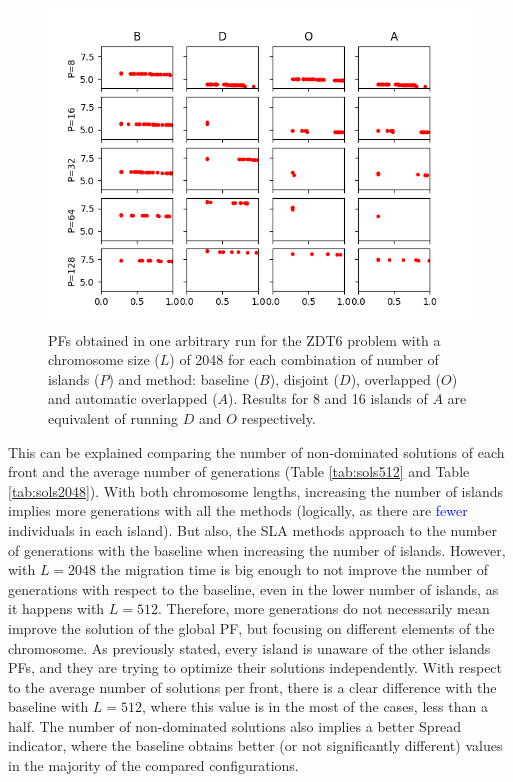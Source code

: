 \documentclass[preprint]{elsarticle}
\begin{document}
\begin{figure}
\centering
\includegraphics[width=12cm]{plot_zdt6_2048.png}
\caption{PFs obtained in one arbitrary run for the ZDT6 problem with a chromosome size ($L$) of 2048 for each combination of number of islands ($P$) and method: baseline ($B$), disjoint ($D$), overlapped ($O$) and automatic overlapped ($A$). Results for 8 and 16 islands of $A$ are equivalent of running $D$ and $O$ respectively. }
\label{fig:plot_zdt6_2048}
\end{figure}



This can be explained comparing the number of non-dominated solutions
of each front and the average number of generations (Table
\ref{tab:sols512} and Table \ref{tab:sols2048}). With both chromosome
lengths, increasing the number of islands implies more generations
with all the methods (logically, as there are \textcolor{blue}{fewer} individuals in each
island). But also, the SLA methods
approach to the number of generations with the baseline when
increasing the number of islands. However, with $L=2048$ the migration
time is big enough  to not improve the number of generations
with respect to the baseline, even in the lower number of islands, as
it happens with $L=512$. Therefore, more generations do not
necessarily mean improve the solution of the global PF, but focusing on
different elements of the chromosome. As  previously stated, every
island is unaware of the other islands PFs, and they are trying to
optimize their solutions independently. With respect to the average
number of solutions per front, there is a clear difference 
 with the baseline with $L=512$, where this value is in the most
of the cases, less than a half. The number of non-dominated solutions
also implies a better Spread indicator, where the baseline 
 obtains better (or not significantly different) values in the majority of the compared configurations.
\end{document}

